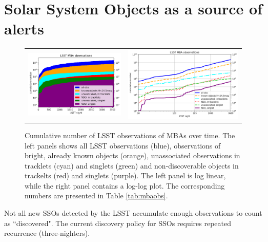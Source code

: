\section{Solar System Objects as a source of alerts} \label{sec:noise}
\begin{figure}[tb!]
\begin{center}
\begin{tabular}{cc}
\includegraphics[width=0.5\linewidth]{figs/cum_un_obs_first.png} &
\includegraphics[width=0.5\linewidth]{figs/cum_un_obs_first2.png}\\
\end{tabular}
\end{center}
\caption{Cumulative number of \gls{LSST} observations of MBAs over time. The left panels shows all \gls{LSST} observations (blue), observations of bright, already known objects (orange), unassociated observations in tracklets (cyan) and singlets (green) and non-discoverable objects in trackelts (red) and singlets (purple).
The left panel is log linear, while the right panel contains a log-log plot. The corresponding numbers are presented in Table \ref{tab:mbaobs}.\label{fig:cum_un_obs}}
\end{figure}
%
Not all new SSOs detected by the \gls{LSST} accumulate enough observations to count as ``discovered".
The current discovery policy for SSOs requires repeated recurrence (three-nighters).
